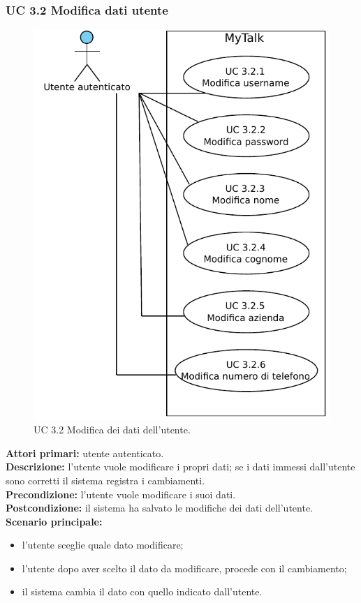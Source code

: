 \newpage

\subsubsection{UC 3.2 Modifica dati utente}

\begin{figure}[htbp]
\centering
\includegraphics[scale=0.7]{./casi_uso/UC3-2.pdf}
\caption{UC 3.2 Modifica dei dati dell'utente.}
\end{figure}

\noindent
\textbf{Attori primari:} utente autenticato.\\
\textbf{Descrizione:} l'utente vuole modificare i propri dati; se i dati immessi dall'utente sono corretti il sistema registra i cambiamenti.\\
\textbf{Precondizione:} l'utente vuole modificare i suoi dati.\\
\textbf{Postcondizione:} il sistema ha salvato le modifiche dei dati dell'utente.\\
\textbf{Scenario principale:}
\begin{itemize}
\item l'utente sceglie quale dato modificare;
\item l'utente dopo aver scelto il dato da modificare, procede con il cambiamento;
\item il sistema cambia il dato con quello indicato dall'utente.
\end{itemize}

